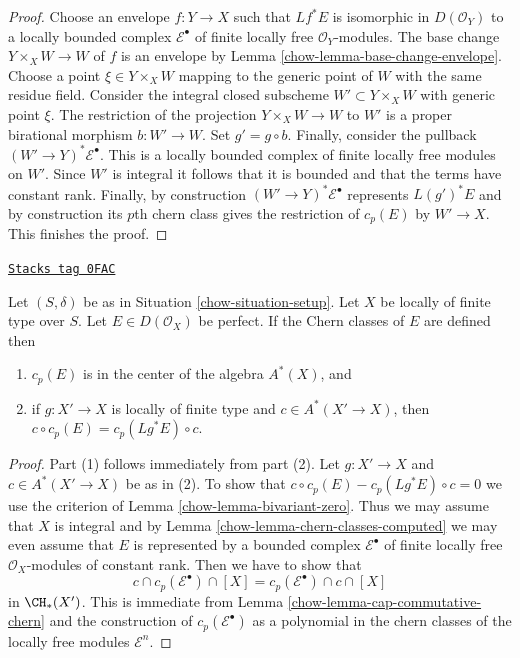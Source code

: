 \begin{proof}

Choose an envelope $f : Y \to X$ such that $Lf^*E$ is isomorphic in
$D(\mathcal{O}_Y)$ to a locally bounded complex $\mathcal{E}^\bullet$
of finite locally free $\mathcal{O}_Y$-modules. The base change
$Y \times_X W \to W$ of $f$ is an envelope by
Lemma \ref{chow-lemma-base-change-envelope}. Choose a point
$\xi \in Y \times_X W$ mapping to the generic point of $W$
with the same residue field. Consider the integral closed subscheme
$W' \subset Y \times_X W$ with generic point $\xi$. The restriction
of the projection $Y \times_X W \to W$ to $W'$ is a proper birational
morphism $b : W' \to W$. Set $g' = g \circ b$. Finally, consider the
pullback $(W' \to Y)^*\mathcal{E}^\bullet$. This is a locally bounded
complex of finite locally free modules on $W'$. Since $W'$ is integral
it follows that it is bounded and that the terms have constant rank.
Finally, by construction $(W' \to Y)^*\mathcal{E}^\bullet$
represents $L(g')^*E$ and by construction its $p$th chern class
gives the restriction of $c_p(E)$ by $W' \to X$. This finishes the proof.
\end{proof}

\begin{lemma}
\label{chow-lemma-commutative-chern-perfect}
\href{https://stacks.math.columbia.edu/tag/0FAC}{\texttt{Stacks tag 0FAC}}

Let $(S, \delta)$ be as in Situation \ref{chow-situation-setup}.
Let $X$ be locally of finite type over $S$.
Let $E \in D(\mathcal{O}_X)$ be perfect. If the Chern classes
of $E$ are defined then
\begin{enumerate}
\item $c_p(E)$ is in the center of the algebra $A^*(X)$, and
\item if $g : X' \to X$ is locally of finite type and $c \in A^*(X' \to X)$,
then $c \circ c_p(E) = c_p(Lg^*E) \circ c$.
\end{enumerate}
\end{lemma}

\begin{proof}

Part (1) follows immediately from part (2). Let $g : X' \to X$ and
$c \in A^*(X' \to X)$ be as in (2). To show that
$c \circ c_p(E) - c_p(Lg^*E) \circ c = 0$ we use the criterion of
Lemma \ref{chow-lemma-bivariant-zero}. Thus we may assume that $X$
is integral and by Lemma \ref{chow-lemma-chern-classes-computed}
we may even assume that $E$ is represented
by a bounded complex $\mathcal{E}^\bullet$
of finite locally free $\mathcal{O}_X$-modules of constant rank.
Then we have to show that
$$
c \cap c_p(\mathcal{E}^\bullet) \cap [X] =
c_p(\mathcal{E}^\bullet) \cap c \cap [X]
$$
in $\CH_*(X')$. This is immediate from
Lemma \ref{chow-lemma-cap-commutative-chern} and the construction
of $c_p(\mathcal{E}^\bullet)$ as a polynomial in the
chern classes of the locally free modules $\mathcal{E}^n$.
\end{proof}

